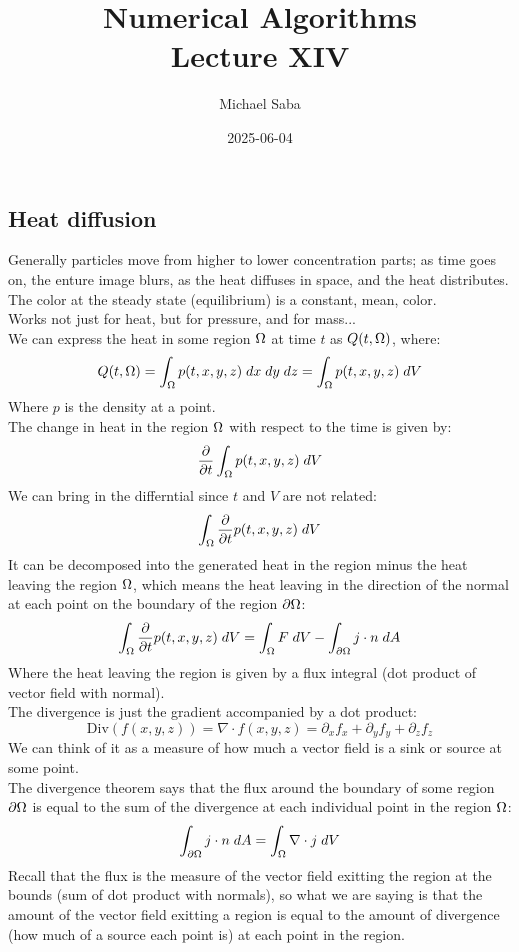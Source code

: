 \documentclass[12pt]{article}
\title{%
    \Huge Numerical Algorithms \\
    \Large Lecture XIV
}
\date{2025-06-04}
\author{Michael Saba}
\begin{document}
\maketitle
\newpage
\setlength{\parindent}{0pt}

\subsection*{Heat diffusion}

Generally particles move from higher to lower concentration
parts; as time goes on, the enture image blurs, as
the heat diffuses in space, and the heat distributes. \\
The color at the steady state
(equilibrium) is a constant, mean, color. \\

Works not just for heat, but for pressure, and for
mass... \\

We can express the heat
in some region $\Omega$ at time $t$
as $Q(t, \Omega)$, where:
\[ Q(t, \Omega) = \int_\Omega p(t, x, y, z) 
\; dx \; dy \; dz
= \int_\Omega p(t, x, y, z) \; dV \]
Where $p$ is the density at a point. \\

The change in heat in the region $\Omega$
with respect to the time is given by:
\[ \dfrac{\partial }{\partial t} \int_\Omega p(t, x, y, z) \; dV \]
We can bring in the differntial
since $t$ and $V$ are not related:
\[ \int_\Omega \dfrac{\partial }{\partial t} p(t, x, y, z) \; dV \]
It can be decomposed into the generated
heat in the region minus the heat
leaving the region $\Omega$,
which means the heat leaving in the direction
of the normal at each point
on the boundary of the region $\partial \Omega$:
\[ \int_\Omega  \dfrac{\partial }{\partial t}p(t, x, y, z) \; dV
= \int_\Omega F \; dV
- \int_{\partial \Omega} j \cdot n \; dA \]
Where the heat leaving the region is
given by a flux integral (dot product
of vector field with normal). \\

The divergence is just the gradient
accompanied by a dot product:
\[ \text{Div}(f(x, y, z))
= \nabla \cdot f(x, y, z)
= \partial_x f_x + \partial_y f_y
+ \partial_z f_z \]
We can think of it as a measure of how much
a vector field is a sink or source at 
some point. \\

The divergence theorem
says that the flux around the boundary
of some region $\partial \Omega$ 
is equal to the sum of the divergence at each 
individual point in the region $\Omega$:
\[ \int_{\partial \Omega} j \cdot n \; dA
= \int_{\Omega} \nabla \cdot j \; dV\]
Recall that the flux is the measure of
the vector field exitting the region
at the bounds (sum of dot product with normals),
so what we are saying is that the amount
of the vector field exitting a region
is equal to the amount of divergence
(how much of a source each point is)
at each point in the region. \\
\end{document}
